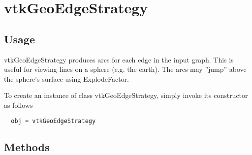 \section{vtkGeoEdgeStrategy}

\subsection{Usage}

 vtkGeoEdgeStrategy produces arcs for each edge in the input graph.
 This is useful for viewing lines on a sphere (e.g. the earth).
 The arcs may ''jump'' above the sphere's surface using ExplodeFactor.

To create an instance of class vtkGeoEdgeStrategy, simply
invoke its constructor as follows
\begin{verbatim}
  obj = vtkGeoEdgeStrategy
\end{verbatim}
\subsection{Methods}

